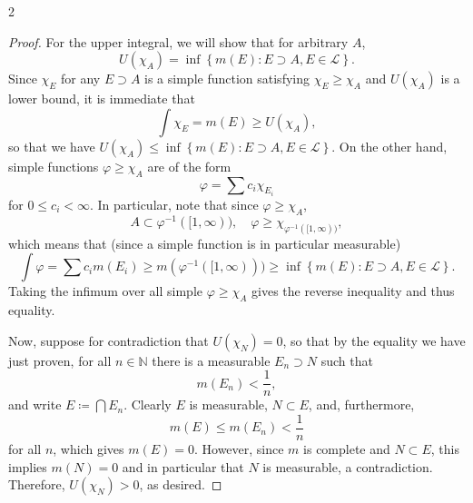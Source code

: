 \documentclass[11pt]{article}
\begin{document}
\begin{problem}{2}
\begin{enumerate}[label=(\alph*)]
\begin{proof}
  For the upper integral, we will show that for arbitrary \( A \),
  \begin{equation}
    \label{eq:6}
    U(\chi_A) = \inf \left\{ m(E):E \supset A, E \in \mathcal{L}  \right\}.
  \end{equation}
  Since \(\chi_E\) for any \( E \supset A \) is a simple function satisfying \( \chi_E \geq \chi_A \) and \( U(\chi_A) \) is a lower bound, it is immediate that
  \begin{equation}
  \label{eq:7}
  \int \chi_E = m(E) \geq U(\chi_A),
\end{equation}
so that we have \( U(\chi_A) \leq \inf \left\{ m(E): E \supset A, E \in \mathcal{L} \right\} \).
On the other hand, simple functions \( \varphi \geq \chi_A \) are of the form
\begin{equation}
\label{eq:8}
\varphi = \sum c_i\chi_{E_i}
\end{equation}
for \( 0 \leq c_i < \infty \).
In particular, note that since \( \varphi \geq \chi_{A} \),
\begin{equation}
\label{eq:11}
A \subset \varphi^{-1}([1, \infty)), \quad \varphi \geq \chi_{\varphi^{-1}([1,\infty))},
\end{equation}
which means that (since a simple function is in particular measurable)
\begin{equation}
\label{eq:12}
\int \varphi = \sum c_i m(E_i) \geq m(\varphi^{-1}([1,\infty))) \geq \inf \left\{ m(E) : E \supset A, E \in \mathcal{L} \right\}.
\end{equation}
Taking the infimum over all simple \(\varphi \geq \chi_A\) gives the reverse inequality and thus equality.

Now, suppose for contradiction that \( U(\chi_N) = 0 \), so that by the equality we have just proven, for all \( n \in \mathbb{N} \) there is a measurable \( E_n \supset N \) such that
\begin{equation}
\label{eq:14}
m(E_n) < \frac{1}{n},
\end{equation}
and write \( E \coloneq \bigcap E_n \).
Clearly \( E \) is measurable, \( N \subset E \), and, furthermore,
\begin{equation}
\label{eq:15}
m(E) \leq m(E_n) < \frac{1}{n}
\end{equation}
for all \( n \), which gives \( m(E) = 0 \).
However, since \( m \) is complete and \( N \subset E \), this implies \( m(N) = 0 \) and in particular that \( N \) is measurable, a contradiction.
Therefore, \( U(\chi_N) > 0 \), as desired.


\end{proof}
\end{enumerate}
\end{problem}
\end{document}

